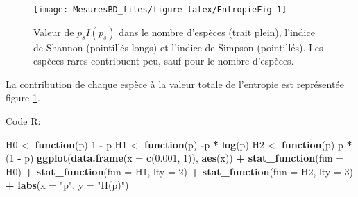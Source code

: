 \documentclass[
  11pt,
  french,
  a4paper,
  extrafontsizes,onecolumn,openright
  ]{memoir}
\newenvironment{Shaded}{\begin{snugshade}}{\end{snugshade}}
\newcommand{\ControlFlowTok}[1]{\textcolor[rgb]{0.13,0.29,0.53}{\textbf{#1}}}
\newcommand{\DataTypeTok}[1]{\textcolor[rgb]{0.13,0.29,0.53}{#1}}
\newcommand{\DecValTok}[1]{\textcolor[rgb]{0.00,0.00,0.81}{#1}}
\newcommand{\FloatTok}[1]{\textcolor[rgb]{0.00,0.00,0.81}{#1}}
\newcommand{\KeywordTok}[1]{\textcolor[rgb]{0.13,0.29,0.53}{\textbf{#1}}}
\newcommand{\NormalTok}[1]{#1}
\newcommand{\OperatorTok}[1]{\textcolor[rgb]{0.81,0.36,0.00}{\textbf{#1}}}
\newcommand{\StringTok}[1]{\textcolor[rgb]{0.31,0.60,0.02}{#1}}
\begin{document}
\normalsize



\scriptsize

\begin{figure}

{\centering \texttt{[image: MesuresBD\_files/figure-latex/EntropieFig-1]} 

}

\caption{Valeur de \(p_{s}I(p_s)\) dans le nombre d'espèces (trait plein), l'indice de Shannon (pointillés longs) et l'indice de Simpson (pointillés). Les espèces rares contribuent peu, sauf pour le nombre d'espèces.}\label{fig:EntropieFig}
\end{figure}

\normalsize

La contribution de chaque espèce à la valeur totale de l'entropie est représentée figure \ref{fig:EntropieFig}.

Code R:

\scriptsize

\begin{Shaded}
\begin{Highlighting}[]
\NormalTok{H0 <-}\StringTok{ }\ControlFlowTok{function}\NormalTok{(p) }\DecValTok{1} \OperatorTok{-}\StringTok{ }\NormalTok{p}
\NormalTok{H1 <-}\StringTok{ }\ControlFlowTok{function}\NormalTok{(p) }\OperatorTok{-}\NormalTok{p }\OperatorTok{*}\StringTok{ }\KeywordTok{log}\NormalTok{(p)}
\NormalTok{H2 <-}\StringTok{ }\ControlFlowTok{function}\NormalTok{(p) p }\OperatorTok{*}\StringTok{ }\NormalTok{(}\DecValTok{1} \OperatorTok{-}\StringTok{ }\NormalTok{p)}
\KeywordTok{ggplot}\NormalTok{(}\KeywordTok{data.frame}\NormalTok{(}\DataTypeTok{x =} \KeywordTok{c}\NormalTok{(}\FloatTok{0.001}\NormalTok{, }\DecValTok{1}\NormalTok{)), }\KeywordTok{aes}\NormalTok{(x)) }\OperatorTok{+}\StringTok{ }\KeywordTok{stat_function}\NormalTok{(}\DataTypeTok{fun =}\NormalTok{ H0) }\OperatorTok{+}
\StringTok{    }\KeywordTok{stat_function}\NormalTok{(}\DataTypeTok{fun =}\NormalTok{ H1, }\DataTypeTok{lty =} \DecValTok{2}\NormalTok{) }\OperatorTok{+}\StringTok{ }\KeywordTok{stat_function}\NormalTok{(}\DataTypeTok{fun =}\NormalTok{ H2,}
    \DataTypeTok{lty =} \DecValTok{3}\NormalTok{) }\OperatorTok{+}\StringTok{ }\KeywordTok{labs}\NormalTok{(}\DataTypeTok{x =} \StringTok{"p"}\NormalTok{, }\DataTypeTok{y =} \StringTok{"H(p)"}\NormalTok{)}
\end{Highlighting}
\end{Shaded}

\normalsize
\end{document}

